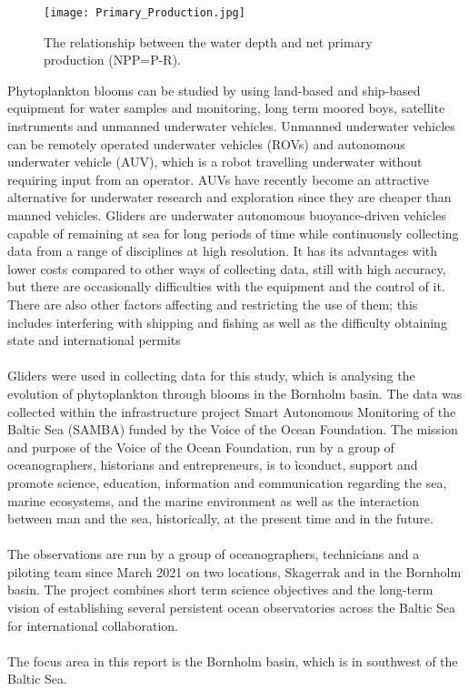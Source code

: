 \documentclass[../Main.tex]{subfiles}
\begin{document}
\begin{figure}[H]
\texttt{[image: Primary\_Production.jpg]}
\caption{ The relationship between the water depth and net primary production (NPP=P-R).\supercite{}}
\end{figure}

Phytoplankton blooms can be studied by using land-based and ship-based equipment for water samples and monitoring, long term moored boys, satellite instruments and unmanned underwater vehicles.\supercite{}
Unmanned underwater vehicles can be remotely operated underwater vehicles (ROVs) and autonomous underwater vehicle (AUV), 
which is a robot travelling underwater without requiring input from an operator. 
AUVs have recently become an attractive alternative for underwater research and exploration since they are cheaper than manned vehicles. 
Gliders are underwater autonomous buoyance-driven vehicles capable of remaining at sea for long periods of time while continuously collecting data from a range of disciplines at high resolution. 
It has its advantages with lower costs compared to other ways of collecting data, still with high accuracy, but there are occasionally difficulties with the equipment and the control of it. 
There are also other factors affecting and restricting the use of them; this includes interfering with shipping and fishing as well as the difficulty obtaining state and international permits
\\
\\
Gliders were used in collecting data for this study, which is analysing the evolution of phytoplankton through blooms in the Bornholm basin. 
The data was collected within the infrastructure project Smart Autonomous Monitoring of the Baltic Sea (SAMBA) funded by the Voice of the Ocean Foundation. 
The mission and purpose of the Voice of the Ocean Foundation, run by a group of oceanographers, historians and entrepreneurs, is to ìconduct, 
support and promote science, education, information and communication regarding the sea, marine ecosystems, 
and the marine environment as well as the interaction between man and the sea, historically, at the present time and in the future.\supercite{}
\\
\\
The observations are run by a group of oceanographers, technicians and a piloting team since March 2021 on two locations, Skagerrak and in the Bornholm basin. 
The project combines short term science objectives and the long-term vision of establishing several persistent ocean observatories across the Baltic Sea for international collaboration.\supercite{}
\\
\\
The focus area in this report is the Bornholm basin, which is in southwest of the Baltic Sea. 
\end{document}
